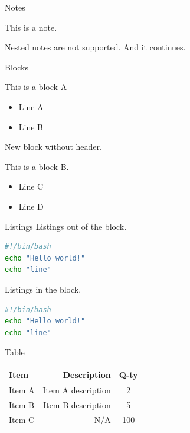 \documentclass[
  11pt,
  ignorenonframetext,
  aspectratio=169,
  aspectratio=169]{beamer}
\providecommand{\tightlist}{%
  \setlength{\itemsep}{0pt}\setlength{\parskip}{0pt}}
\renewenvironment{quote}{\begin{customblockquote}\list{}{\rightmargin=0em\leftmargin=0em}%
\item\relax\color{blockquote-text}\ignorespaces}{\unskip\unskip\endlist\end{customblockquote}}
\begin{document}
\begin{frame}{Notes}
\protect\hypertarget{notes}{}
\begin{quote}
This is a note.

\begin{quote}
Nested notes are not supported. And it continues.
\end{quote}
\end{quote}
\end{frame}

\begin{frame}{Blocks}
\protect\hypertarget{blocks}{}
\begin{block}{This is a block A}
\protect\hypertarget{this-is-a-block-a}{}
\begin{itemize}
\tightlist
\item
  Line A
\item
  Line B
\end{itemize}
\end{block}

\begin{block}{}
\protect\hypertarget{section}{}
New block without header.
\end{block}

\begin{block}{This is a block B.}
\protect\hypertarget{this-is-a-block-b.}{}
\begin{itemize}
\tightlist
\item
  Line C
\item
  Line D
\end{itemize}
\end{block}
\end{frame}

\begin{frame}[fragile]{Listings}
\protect\hypertarget{listings}{}
Listings out of the block.

\begin{lstlisting}[language=sh]
#!/bin/bash
echo "Hello world!"
echo "line"
\end{lstlisting}

\begin{block}{Listings in the block.}
\protect\hypertarget{listings-in-the-block.}{}
\begin{lstlisting}[language=sh]
#!/bin/bash
echo "Hello world!"
echo "line"
\end{lstlisting}
\end{block}
\end{frame}

\begin{frame}{Table}
\protect\hypertarget{table}{}
\begin{longtable}[]{@{}lrc@{}}
\toprule\noalign{}
\textbf{Item} & \textbf{Description} & \textbf{Q-ty} \\
\midrule\noalign{}
\endhead
\bottomrule\noalign{}
\endlastfoot
Item A & Item A description & 2 \\
Item B & Item B description & 5 \\
Item C & N/A & 100 \\
\end{longtable}
\end{frame}
\end{document}

